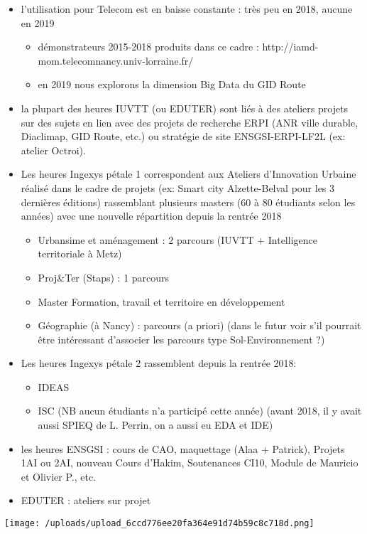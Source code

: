\begin{itemize}
\item
  l'utilisation pour Telecom est en baisse constante : très peu en 2018,
  aucune en 2019

  \begin{itemize}
  \tightlist
  \item
    démonstrateurs 2015-2018 produits dans ce cadre :
    http://iamd-mom.telecomnancy.univ-lorraine.fr/
  \item
    en 2019 nous explorons la dimension Big Data du GID Route
  \end{itemize}
\item
  la plupart des heures IUVTT (ou EDUTER) sont liés à des ateliers
  projets sur des sujets en lien avec des projets de recherche ERPI (ANR
  ville durable, Diaclimap, GID Route, etc.) ou stratégie de site
  ENSGSI-ERPI-LF2L (ex: atelier Octroi).
\item
  Les heures Ingexys pétale 1 correspondent aux Ateliers d'Innovation
  Urbaine réalisé dans le cadre de projets (ex: Smart city
  Alzette-Belval pour les 3 dernières éditions) rassemblant plusieurs
  masters (60 à 80 étudiants selon les années) avec une nouvelle
  répartition depuis la rentrée 2018

  \begin{itemize}
  \tightlist
  \item
    Urbansime et aménagement : 2 parcours (IUVTT + Intelligence
    territoriale à Metz)
  \item
    Proj\&Ter (Staps) : 1 parcours
  \item
    Master Formation, travail et territoire en développement
  \item
    Géographie (à Nancy) : parcours (a priori) (dans le futur voir s'il
    pourrait être intéressant d'associer les parcours type
    Sol-Environnement ?)
  \end{itemize}
\item
  Les heures Ingexys pétale 2 rassemblent depuis la rentrée 2018:

  \begin{itemize}
  \tightlist
  \item
    IDEAS
  \item
    ISC (NB aucun étudiants n'a participé cette année) (avant 2018, il y
    avait aussi SPIEQ de L. Perrin, on a aussi eu EDA et IDE)
  \end{itemize}
\item
  les heures ENSGSI : cours de CAO, maquettage (Alaa + Patrick), Projets
  1AI ou 2AI, nouveau Cours d'Hakim, Soutenances CI10, Module de
  Mauricio et Olivier P., etc.
\item
  EDUTER : ateliers sur projet
\end{itemize}

\texttt{[image: /uploads/upload\_6ccd776ee20fa364e91d74b59c8c718d.png]}

